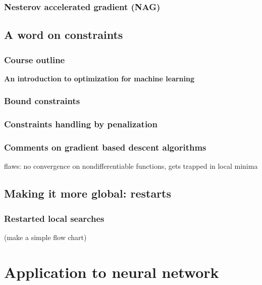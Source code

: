 \documentclass[12pt]{beamer}
\begin{document}
\begin{frame}
\frametitle{Nesterov accelerated gradient (NAG)} 
\wip
\end{frame}

\subsection{A word on constraints}

\begin{frame}%
\frametitle{Course outline} 
\begin{center} \textbf{An introduction to optimization for machine learning} \end{center}
\tableofcontents[currentsection]
\end{frame}

\begin{frame}
\frametitle{Bound constraints} 
\wip
\end{frame}

\begin{frame}
\frametitle{Constraints handling by penalization} 
\wip
\end{frame}

\begin{frame}
\frametitle{Comments on gradient based descent algorithms} 
\wip
flaws: no convergence on nondifferentiable functions, gets trapped in local minima
\end{frame}

\subsection{Making it more global: restarts}

\begin{frame}
\frametitle{Restarted local searches} 
\wip (make a simple flow chart)
\end{frame}


\section{Application to neural network}
\end{document}
